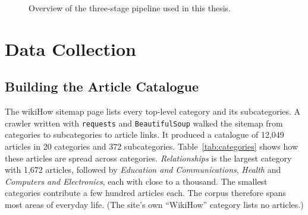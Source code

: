 \documentclass[12pt,a4paper,oneside]{report}
\begin{document}
\begin{figure}[ht]
\caption{Overview of the three-stage pipeline used in this thesis.}
\label{fig:pipeline}
\end{figure}

\section{Data Collection}
\subsection{Building the Article Catalogue}
The wikiHow sitemap page lists every top-level category and its subcategories. A crawler written with \texttt{requests} and \texttt{BeautifulSoup} walked the sitemap from categories to subcategories to article links. It produced a catalogue of 12{,}049 articles in 20 categories and 372 subcategories. Table~\ref{tab:categories} shows how these articles are spread across categories. \emph{Relationships} is the largest category with 1{,}672 articles, followed by \emph{Education and Communications}, \emph{Health} and \emph{Computers and Electronics}, each with close to a thousand. The smallest categories contribute a few hundred articles each. The corpus therefore spans most areas of everyday life. (The site's own ``WikiHow'' category lists no articles.)
\end{document}
